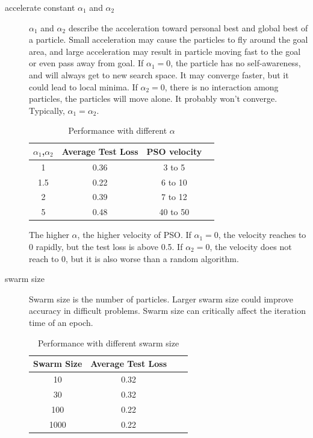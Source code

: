 \documentclass[12pt]{article}
\begin{document}
\begin{description}
\item[accelerate constant $\alpha_1$ and $\alpha_2$ ] 

$\alpha_1$ and $\alpha_2$ describe the acceleration toward personal best and global best of a particle.
Small acceleration may cause the particles to fly around the goal area, and large acceleration may result in particle moving fast to the goal or even pass away from goal. If $\alpha_1 = 0$, the particle has no self-awareness, and will always get to new search space. It may converge faster, but it could lead to local minima. If $\alpha_2=0$, there is no interaction among particles, the particles will move alone. It probably won't converge.
Typically, $\alpha_1 = \alpha_2$.

\begin{table}[h]
\centering
\begin{tabular}{@{}cccc@{}}
\toprule
$\alpha_1$,$\alpha_2$ & Average Test Loss & PSO velocity \\ \midrule
1 & 0.36 & 3 to 5  \\
1.5 & 0.22  &  6 to 10  \\
2 & 0.39  &   7 to 12 \\
5  & 0.48  &  40 to 50  \\
\bottomrule
\end{tabular}
\caption{Performance with different $\alpha$}
\label{t_alpha}
\end{table}
The higher $\alpha$, the higher velocity of PSO.
If $\alpha_1 = 0$, the velocity reaches to 0 rapidly, but the test loss is above 0.5. If $\alpha_2 = 0$, the velocity does not reach to 0, but it is also worse than a random algorithm.

\end{description}
\begin{description}
\item[swarm size]
Swarm size is the number of particles. Larger swarm size could improve accuracy in difficult problems. Swarm size can critically affect the iteration time of an epoch.
\begin{table}[h]
\centering
\begin{tabular}{@{}cccc@{}}
\toprule
Swarm Size & Average Test Loss  \\ \midrule
10 & 0.32 \\
30 & 0.32    \\
100 & 0.22  \\
1000  & 0.22   \\
\bottomrule
\end{tabular}
\caption{Performance with different swarm size}
\label{t_swarm}
\end{table}
\end{description}
\end{document}
